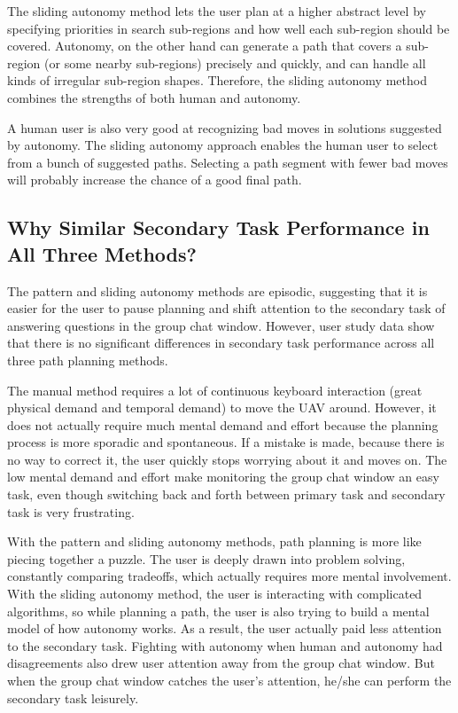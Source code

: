 The sliding autonomy method lets the user plan at a higher abstract level by specifying priorities in search sub-regions and how well each sub-region should be covered. Autonomy, on the other hand can generate a path that covers a sub-region (or some nearby sub-regions) precisely and quickly, and can handle all kinds of irregular sub-region shapes. Therefore, the sliding autonomy method combines the strengths of both human and autonomy.

A human user is also very good at recognizing bad moves in solutions suggested by autonomy. The sliding autonomy approach enables the human user to select from a bunch of suggested paths. Selecting a path segment with fewer bad moves will probably increase the chance of a good final path.

\subsection{Why Similar Secondary Task Performance in All Three Methods?}

The pattern and sliding autonomy methods are episodic, suggesting that it is easier for the user to pause planning and shift attention to the secondary task of answering questions in the group chat window. However, user study data show that there is no significant differences in secondary task performance across all three path planning methods.

The manual method requires a lot of continuous keyboard interaction (great physical demand and temporal demand) to move the UAV around. However, it does not actually require much mental demand and effort because the planning process is more sporadic and spontaneous. If a mistake is made, because there is no way to correct it, the user quickly stops worrying about it and moves on. The low mental demand and effort make monitoring the group chat window an easy task, even though switching back and forth between primary task and secondary task is very frustrating.

With the pattern and sliding autonomy methods, path planning is more like piecing together a puzzle. The user is deeply drawn into problem solving, constantly comparing tradeoffs, which actually requires more mental involvement. With the sliding autonomy method, the user is interacting with complicated algorithms, so while planning a path, the user is also trying to build a mental model of how autonomy works. As a result, the user actually paid less attention to the secondary task. Fighting with autonomy when human and autonomy had disagreements also drew user attention away from the group chat window. But when the group chat window catches the user's attention, he/she can perform the secondary task leisurely.

